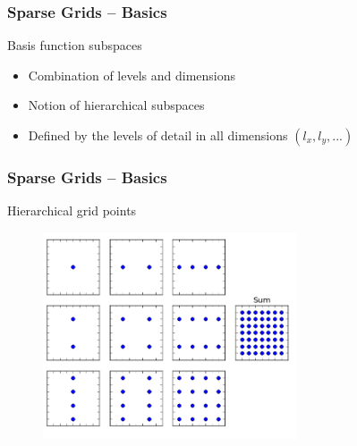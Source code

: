 \begin{frame}
  \frametitle{Sparse Grids -- Basics}
  \topline
  \vspace{-10px}
  \begin{block}{Basis function subspaces}
    \begin{itemize}
      \item Combination of levels and dimensions
      \item Notion of hierarchical subspaces
      \item Defined by the levels of detail in all dimensions $(l_x, l_y, ...)$
    \end{itemize}
  \end{block}
\end{frame}

\begin{frame}
  \frametitle{Sparse Grids -- Basics}
  \topline
  \vspace{-10px}
  \begin{block}{Hierarchical grid points}
    \begin{figure}[!htp]
      \centering
      \includegraphics[width=7.5cm]{images/sparsegrid_hirach1}
      \vspace{-12px}
      \caption{}
    \end{figure}
  \end{block}
\end{frame}

